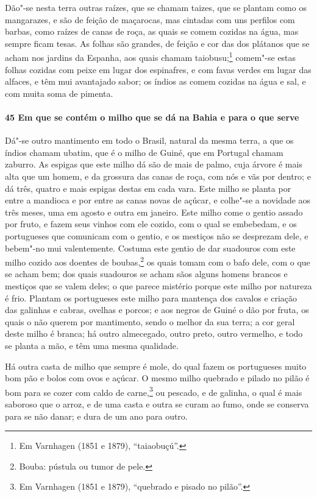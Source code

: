 \begin{linenumbers}
Dão"-se nesta terra outras raízes, que se chamam taizes, que se 
plantam como os mangarazes, e são de feição de maçarocas, mas cintadas com uns
perfilos com barbas, como raízes de canas de roça, as quais se comem cozidas na água, mas
sempre ficam tesas. As folhas são grandes, de feição e cor das dos plátanos que se acham
nos jardins da Espanha, aos quais chamam taiobusu;\footnote{ Em Varnhagen (1851 e 1879),
``taiaobuçú''.} comem"-se estas folhas cozidas com peixe em lugar dos espinafres, e com
favas verdes em lugar das alfaces, e têm mui avantajado sabor; os índios as comem cozidas
na água e sal, e com muita soma de pimenta.

\paragraph{45 Em que se contém o milho que se dá na Bahia e para o que serve}\quad
Dá"-se outro mantimento em todo o Brasil, natural da mesma terra, a que os índios chamam
ubatim, que é o milho de Guiné, que em Portugal chamam zaburro. As espigas que este milho
dá são de mais de palmo, cuja árvore é mais alta que um homem, e da grossura das canas de
roça, com nós e vãs por dentro; e dá três, quatro e mais espigas destas em cada vara. Este
milho se planta por entre a mandioca e por entre as canas novas de açúcar, e colhe"-se a
novidade aos três meses, uma em agosto e outra em janeiro. Este milho come o gentio assado
por fruto, e fazem seus vinhos com ele cozido, com o qual se embebedam, e os portugueses
que comunicam com o gentio, e os mestiços não se desprezam dele, e bebem"-no mui
valentemente. Costuma este gentio de dar suadouros com este milho cozido aos doentes de
boubas,\footnote{ Bouba: pústula ou tumor de
pele.} os quais tomam com o bafo dele, com o que se acham bem;
dos quais suadouros se acham sãos alguns homens brancos e mestiços que se valem deles; o
que parece mistério porque este milho por natureza é frio. Plantam os portugueses este
milho para mantença dos cavalos e criação das galinhas e cabras, ovelhas e porcos; e aos
negros de Guiné o dão por fruta, os quais o não querem por mantimento, sendo o melhor da
sua terra; a cor geral deste milho é branca; há outro almecegado, outro preto, outro
vermelho, e todo se planta a mão, e têm uma mesma qualidade.

Há outra casta de milho que sempre é mole, do qual fazem os portugueses muito bom pão e
bolos com ovos e açúcar. O mesmo milho quebrado e pilado no pilão é bom para se cozer com
caldo de carne,\footnote{ Em Varnhagen (1851 e 1879), ``quebrado e pisado no pilão''.} ou
pescado, e de galinha, o qual é mais saboroso que o arroz, e de uma casta e outra se curam
ao fumo, onde se conserva para se não danar; e dura de um ano para outro.


\end{linenumbers}
